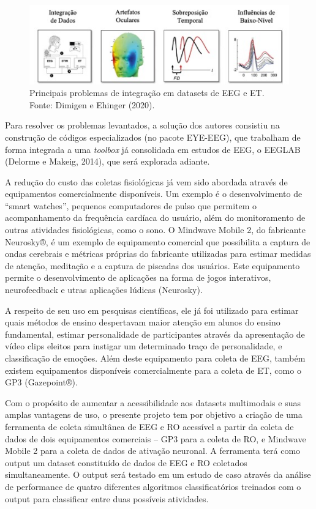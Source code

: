 \documentclass[a4paper, 12pt]{ppgeb}
\begin{document}
\begin{figure}[h]
    \centering
    \includegraphics[width=130mm]{problemas_eeget.jpg}
    \caption[Exemplo de um acelerador linear utilizado no Hospital Universitário de Brasília.]
    {Principais problemas de integração em datasets de EEG e ET. Fonte: Dimigen e
    Ehinger (2020).}\label{fig:acelerador}
    \end{figure}

Para resolver os problemas levantados, a solução dos autores consistiu na construção de códigos especializados (no pacote EYE-EEG),
que trabalham de forma integrada a uma \textit{toolbox} já consolidada em estudos de EEG, o EEGLAB (Delorme e Makeig, 2014), que será explorada adiante.

 A redução do custo das coletas fisiológicas já vem sido abordada através de equipamentos comercialmente disponíveis. 
Um exemplo é o desenvolvimento de “smart watches”, pequenos computadores de pulso que permitem o acompanhamento da
frequência cardíaca do usuário, além do monitoramento de outras atividades fisiológicas, como o sono. O Mindwave Mobile 2,
do fabricante Neurosky®, é um exemplo de equipamento comercial que possibilita a captura de ondas cerebrais e métricas 
próprias do fabricante utilizadas para estimar medidas de atenção, meditação e a captura de piscadas dos usuários.
Este equipamento permite o desenvolvimento de aplicações na forma de jogos interativos, neurofeedback e 
utras aplicações lúdicas (Neurosky).

A respeito de seu uso em pesquisas científicas, ele já foi utilizado para estimar quais métodos de ensino 
 despertavam maior atenção em alunos do ensino fundamental, estimar personalidade de participantes através
 da apresentação de vídeo clips eleitos para instigar um determinado 
 traço de personalidade, e classificação de emoções. Além deste equipamento para coleta de EEG, 
 também existem equipamentos disponíveis comercialmente para a coleta de ET, como o GP3 (Gazepoint®). 


Com o propósito de aumentar a acessibilidade aos datasets multimodais e suas amplas vantagens de uso, o presente projeto tem por objetivo a criação de uma ferramenta de coleta simultânea de EEG e RO acessível a partir da coleta de dados de dois equipamentos comerciais – GP3 para a coleta de RO, e Mindwave Mobile 2 para a coleta de dados de ativação neuronal. A ferramenta terá como output um dataset constituído de dados de EEG e RO coletados simultaneamente. O output será testado em um estudo de caso através da análise de performance de quatro diferentes algoritmos classificatórios treinados com o output para classificar entre duas possíveis atividades. 
\end{document}
